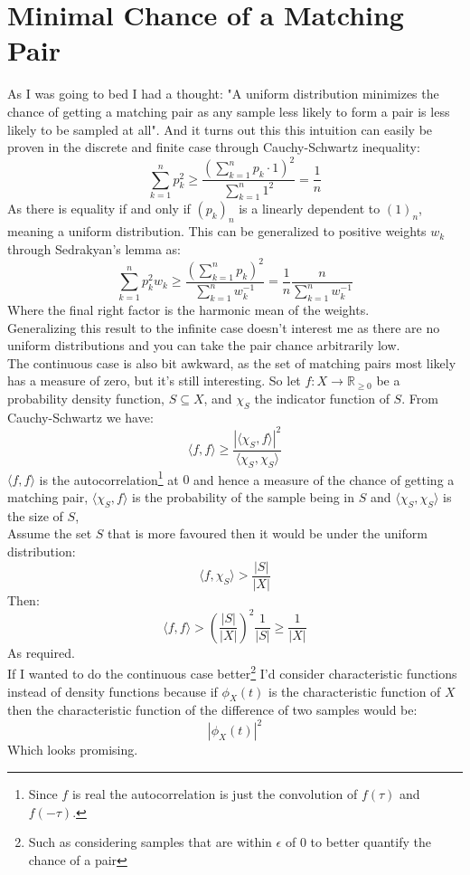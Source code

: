 
\section{Minimal Chance of a Matching Pair}
As I was going to bed I had a thought:
"A uniform distribution minimizes the chance of getting a matching pair as any sample less likely to form a pair is less likely to be sampled at all".  
And it turns out this this intuition can easily be proven in the discrete and finite case through Cauchy-Schwartz inequality:
\[\sum_{k=1}^np_k^2\geq\frac{\left(\sum_{k=1}^np_k\cdot1\right)^2}{\sum_{k=1}^n1^2}=\frac{1}{n}\]
As there is equality if and only if $(p_k)_n$ is a linearly dependent to $(1)_n$,
meaning a uniform distribution.
This can be generalized to positive weights $w_k$ through Sedrakyan's lemma as:
\[\sum_{k=1}^np_k^2w_k \geq \frac{\left(\sum_{k=1}^np_k\right)^2}{\sum_{k=1}^nw_k^{-1}}=\frac{1}{n}\frac{n}{\sum_{k=1}^nw_k^{-1}}\]
Where the final right factor is the harmonic mean of the weights.
\\

Generalizing this result to the infinite case doesn't interest me as there are no uniform distributions and you can take the pair chance arbitrarily low.
\\

The continuous case is also bit awkward,
as the set of matching pairs most likely has a measure of zero,
but it's still interesting.
So let $f:X\rightarrow\mathbb{R}_{\geq0}$ be a probability density function, 
$S\subseteq X$,
and $\chi_S$ the indicator function of $S$.
From Cauchy-Schwartz we have:
\[\langle f,f\rangle \geq \frac{|\langle\chi_S,f\rangle|^2}{\langle\chi_S,\chi_S\rangle}\]
$\langle f,f\rangle$ is the autocorrelation\footnote{
Since $f$ is real the autocorrelation is just the convolution of $f(\tau)$ and $f(-\tau)$.}
at $0$ and hence a measure of the chance of getting a matching pair,
$\langle \chi_S,f\rangle$ is the probability of the sample being in $S$ and $\langle \chi_S,\chi_S\rangle$ is the size of $S$,
\\

Assume the set $S$ that is more favoured then it would be under the uniform distribution:
\[\langle f,\chi_S\rangle > \frac{|S|}{|X|}\]
Then:
\[\langle f,f\rangle > \left(\frac{|S|}{|X|}\right)^2\frac{1}{|S|} \geq \frac{1}{|X|}\]
As required.
\\

If I wanted to do the continuous case better\footnote{
Such as considering samples that are within $\epsilon$ of $0$ to better quantify the chance of a pair} 
I'd consider characteristic functions instead of density functions because if $\phi_X(t)$ is the characteristic function of $X$ then the characteristic function of the difference of two samples would be:
\[|\phi_X(t)|^2\]
Which looks promising.

